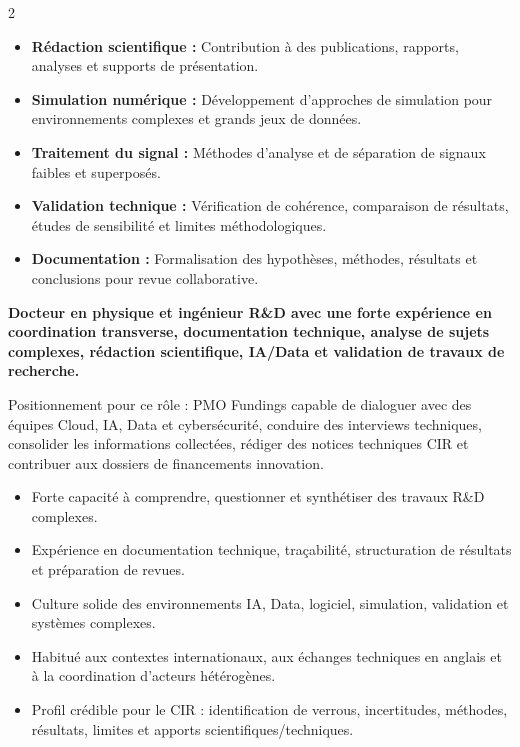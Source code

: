 \documentclass[8pt,a4paper,ragged2e,withhyper]{altacv}
\begin{document}
\begin{paracol}{2}
\begin{itemize}
  \item \textbf{Rédaction scientifique :} Contribution à des publications, rapports, analyses et supports de présentation.
  \item \textbf{Simulation numérique :} Développement d’approches de simulation pour environnements complexes et grands jeux de données.
  \item \textbf{Traitement du signal :} Méthodes d’analyse et de séparation de signaux faibles et superposés.
  \item \textbf{Validation technique :} Vérification de cohérence, comparaison de résultats, études de sensibilité et limites méthodologiques.
  \item \textbf{Documentation :} Formalisation des hypothèses, méthodes, résultats et conclusions pour revue collaborative.
\end{itemize}

\switchcolumn


\textbf{Docteur en physique et ingénieur R\&D avec une forte expérience en coordination transverse, documentation technique, analyse de sujets complexes, rédaction scientifique, IA/Data et validation de travaux de recherche.}

Positionnement pour ce rôle : PMO Fundings capable de dialoguer avec des équipes Cloud, IA, Data et cybersécurité, conduire des interviews techniques, consolider les informations collectées, rédiger des notices techniques CIR et contribuer aux dossiers de financements innovation.

\begin{itemize}
  \item Forte capacité à comprendre, questionner et synthétiser des travaux R\&D complexes.
  \item Expérience en documentation technique, traçabilité, structuration de résultats et préparation de revues.
  \item Culture solide des environnements IA, Data, logiciel, simulation, validation et systèmes complexes.
  \item Habitué aux contextes internationaux, aux échanges techniques en anglais et à la coordination d’acteurs hétérogènes.
  \item Profil crédible pour le CIR : identification de verrous, incertitudes, méthodes, résultats, limites et apports scientifiques/techniques.
\end{itemize}


\end{paracol}
\end{document}
